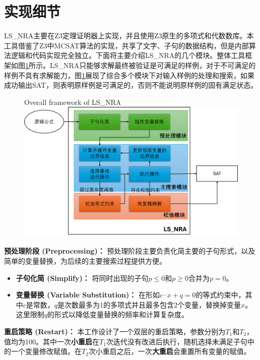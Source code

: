 \section{实现细节}
LS\_NRA主要在Z3定理证明器上实现，并且使用Z3原生的多项式和代数数库。本工具借鉴了Z3中MCSAT算法的实现，共享了文字、子句的数据结构，但是内部算法逻辑和代码实现完全独立。下面将主要介绍LS\_NRA的几个模块。整体工具框架如图\ref{fig:total}所示。LS\_NRA只能够求解最终被验证是可满足的样例，对于不可满足的样例不具有求解能力，图\ref{fig:total}展现了综合多个模块下对输入样例的处理和搜索，如果成功输出SAT，则表明原样例是可满足的，否则不能说明原样例的固有满足状态。

\begin{figure}[]
    \centering
     {Overall framework of LS\_NRA}
    \includegraphics[width=0.9\columnwidth]{Img/structure.png}
    \label{fig:total}
\end{figure}

\textbf{预处理阶段 (Preprocessing)：} 预处理阶段主要负责化简主要的子句形式，以及简单的变量替换，为后续的主要搜索过程提供方便。
\begin{itemize}
    \item \textbf{子句化简 (Simplify)：} 将同时出现的子句$p \le 0$和$p \ge 0$合并为$p = 0$。
    \item \textbf{变量替换 (Variable Substitution)：} 在形如$c \cdot x + q = 0$的等式约束中，其中$c$是常数，$q$是次数最多为1的多项式并且最多包含2个变量，替换掉变量$x$。这里限制$q$的形式以降低变量替换的频率和计算复杂度。
\end{itemize}

\textbf{重启策略 (Restart)：} 本工作设计了一个双层的重启策略，参数分别为$T_1$和$T_2$，值均为100。其中一次\textbf{小重启}在$T_1$次迭代没有改进后执行，随机选择未满足子句中的一个变量修改赋值。在$T_2$次小重启之后，一次\textbf{大重启}会重置所有变量的赋值。


